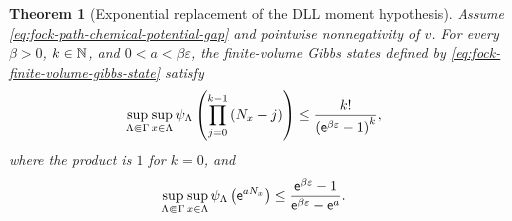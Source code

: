 \documentclass[11pt,a4paper]{article}
\theoremstyle{plain}
\newtheorem{thm}{Theorem}[section]
\theoremstyle{definition}
\theoremstyle{remark}
\begin{document}
\begin{thm}[Exponential replacement of the DLL moment hypothesis]\label{thm:fock-all-temperature-local-number}
Assume \eqref{eq:fock-path-chemical-potential-gap} and pointwise nonnegativity of $v$.
For every $\beta > 0$, $k \in \mathbb{N}$, and $0 < a < \beta\varepsilon$, the finite-volume Gibbs states defined
by \eqref{eq:fock-finite-volume-gibbs-state} satisfy
\begin{equation}
\begin{aligned}
\sup_{\Lambda \Subset \Gamma}
\sup_{x \in \Lambda}
\fun{\oastate[\psi_{\Lambda}]}{
\prod_{j = 0}^{k - 1}\rbk{N_x - j}}
& \leq
\frac{k!}{\rbk{\napiernum^{\beta\varepsilon} - 1}^{k}},
\end{aligned}
\label{eq:fock-factorial-local-number-bound}
\end{equation}
where the product is $1$ for $k = 0$, and
\begin{equation}
\begin{aligned}
\sup_{\Lambda \Subset \Gamma}
\sup_{x \in \Lambda}
\fun{\oastate[\psi_{\Lambda}]}{\napiernum^{aN_x}}
& \leq
\frac{\napiernum^{\beta\varepsilon} - 1}
{\napiernum^{\beta\varepsilon} - \napiernum^{a}}.
\end{aligned}
\label{eq:fock-exponential-local-number-bound}
\end{equation}
\end{thm}
\end{document}
